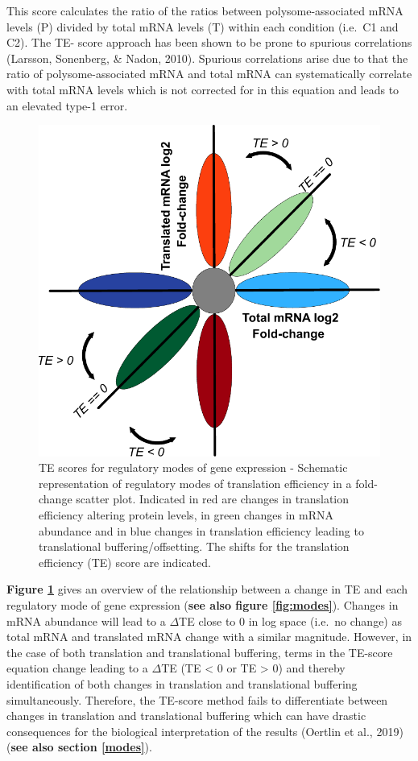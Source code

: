 \documentclass[12pt,openany]{book}
\begin{document}
This score calculates the ratio of the ratios between
polysome-associated mRNA levels (P) divided by total mRNA levels (T)
within each condition (i.e.~C1 and C2). The TE- score approach has been
shown to be prone to spurious correlations (Larsson, Sonenberg, \&
Nadon, 2010). Spurious correlations arise due to that the ratio of
polysome-associated mRNA and total mRNA can systematically correlate
with total mRNA levels which is not corrected for in this equation and
leads to an elevated type-1 error. \clearpage

\begin{figure}
  \includegraphics{./figures/geneModes_TE.pdf}
  \caption{TE scores for regulatory modes of gene expression -  Schematic representation of regulatory modes of translation efficiency in a fold-change scatter plot. Indicated in red are changes in translation efficiency altering protein levels, in green changes in mRNA abundance and in blue changes in translation efficiency leading to translational buffering/offsetting. The shifts for the translation efficiency (TE) score are indicated. \label{fig:TE}}
\end{figure}

\textbf{Figure \ref{fig:TE}} gives an overview of the relationship
between a change in TE and each regulatory mode of gene expression
(\textbf{see also figure \ref{fig:modes}}). Changes in mRNA abundance
will lead to a \(\varDelta\)TE close to 0 in log space (i.e.~no change)
as total mRNA and translated mRNA change with a similar magnitude.
However, in the case of both translation and translational buffering,
terms in the TE-score equation change leading to a \(\varDelta\)TE (TE
\textless{} 0 or TE \textgreater{} 0) and thereby identification of both
changes in translation and translational buffering simultaneously.
Therefore, the TE-score method fails to differentiate between changes in
translation and translational buffering which can have drastic
consequences for the biological interpretation of the results (Oertlin
et al., 2019) (\textbf{see also section \ref{modes}}).
\end{document}
